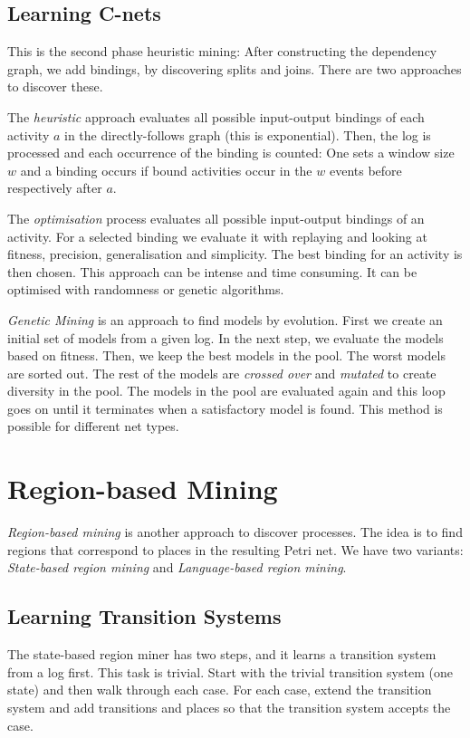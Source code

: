 \documentclass[english]{panikzettel}
\begin{document}
\subsection{Learning C-nets}
This is the second phase heuristic mining: After constructing the dependency graph, we add bindings, by discovering splits and joins.
There are two approaches to discover these.

The \emph{heuristic} approach evaluates all possible input-output bindings of each activity $a$ in the directly-follows graph (this is exponential).
Then, the log is processed and each occurrence of the binding is counted: One sets a window size $w$ and a binding occurs if bound activities occur in the $w$ events before respectively after $a$.

The \emph{optimisation} process evaluates all possible input-output bindings of an activity. For a selected binding we evaluate it with replaying and looking at fitness, precision, generalisation and simplicity. The best binding for an activity is then chosen. This approach can be intense and time consuming. It can be optimised with randomness or genetic algorithms.

\emph{Genetic Mining} is an approach to find models by evolution. First we create an initial set of models from a given log. In the next step, we evaluate the models based on fitness. Then, we keep the best models in the pool. The worst models are sorted out. The rest of the models are \emph{crossed over} and \emph{mutated} to create diversity in the pool. The models in the pool are evaluated again and this loop goes on until it terminates when a satisfactory model is found. This method is possible for different net types.

\section{Region-based Mining}

\emph{Region-based mining} is another approach to discover processes.
The idea is to find regions that correspond to places in the resulting Petri net.
We have two variants: \emph{State-based region mining} and \emph{Language-based region mining}.

\subsection{Learning Transition Systems}

The state-based region miner has two steps, and it learns a transition system from a log first.
This task is trivial.
Start with the trivial transition system (one state) and then walk through each case.
For each case, extend the transition system and add transitions and places so that the transition system accepts the case.
\end{document}

